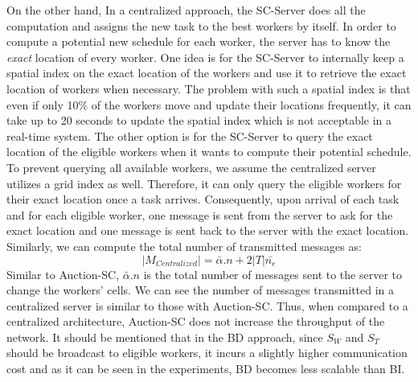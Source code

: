 On the other hand, In a centralized approach, the SC-Server does all the computation and assigns the new task to the best workers by itself. In order to compute a potential new schedule for each worker, the server has to know the \textit{exact} location of every worker. One idea is for the SC-Server to internally keep a spatial index on the exact location of the workers and use it to retrieve the exact location of workers when necessary. The problem with such a spatial index is that even if only 10\% of the workers move and update their locations frequently, it can take up to 20 seconds to update the spatial index \cite{Akdogan14} which is not acceptable in a real-time system. The other option is for the SC-Server to query the exact location of the eligible workers when it wants to compute their potential schedule. To prevent querying all available workers, we assume the centralized server utilizes a grid index as well. Therefore, it can only query the eligible workers for their exact location once a task arrives. Consequently, upon arrival of each task and for each eligible worker, one message is sent from the server to ask for the exact location and one message is sent back to the server with the exact location. Similarly, we can compute the total number of transmitted messages as:
\begin{equation*}
\left| M_{Centralized} \right| = \bar{\alpha}.n + 2|T|\bar{n_e}
\end{equation*}
\noindent Similar to Auction-SC, $\bar{\alpha}.n$ is the total number of messages sent to the server to change the workers' cells. We can see the number of messages transmitted in a centralized server is similar to those with Auction-SC. Thus, when compared to a centralized architecture, Auction-SC does not increase the throughput of the network. It should be mentioned that in the BD approach, since $S_W$ and $S_T$ should be broadcast to eligible workers, it incurs a slightly higher communication cost and as it can be seen in the experiments, BD becomes less scalable than BI.